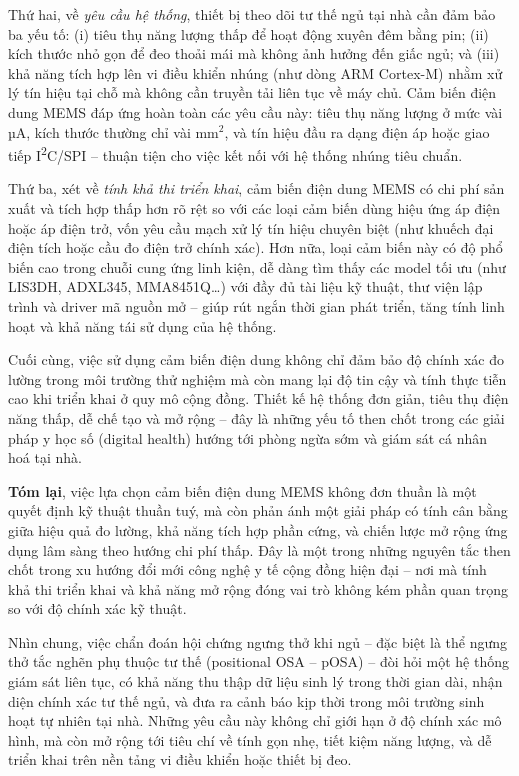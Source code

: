 Thứ hai, về \textit{yêu cầu hệ thống}, thiết bị theo dõi tư thế ngủ tại nhà cần
đảm bảo ba yếu tố: (i) tiêu thụ năng lượng thấp để hoạt động xuyên đêm bằng
pin; (ii) kích thước nhỏ gọn để đeo thoải mái mà không ảnh hưởng đến giấc ngủ;
và (iii) khả năng tích hợp lên vi điều khiển nhúng (như dòng ARM Cortex-M) nhằm
xử lý tín hiệu tại chỗ mà không cần truyền tải liên tục về máy chủ. Cảm biến
điện dung MEMS đáp ứng hoàn toàn các yêu cầu này: tiêu thụ năng lượng ở mức vài
µA, kích thước thường chỉ vài mm$^2$, và tín hiệu đầu ra dạng điện áp hoặc giao
tiếp I\textsuperscript{2}C/SPI – thuận tiện cho việc kết nối với hệ thống nhúng
tiêu chuẩn.

Thứ ba, xét về \textit{tính khả thi triển khai}, cảm biến điện dung MEMS có chi
phí sản xuất và tích hợp thấp hơn rõ rệt so với các loại cảm biến dùng hiệu ứng
áp điện hoặc áp điện trở, vốn yêu cầu mạch xử lý tín hiệu chuyên biệt (như
khuếch đại điện tích hoặc cầu đo điện trở chính xác). Hơn nữa, loại cảm biến
này có độ phổ biến cao trong chuỗi cung ứng linh kiện, dễ dàng tìm thấy các
model tối ưu (như LIS3DH, ADXL345, MMA8451Q\ldots) với đầy đủ tài liệu kỹ
thuật, thư viện lập trình và driver mã nguồn mở – giúp rút ngắn thời gian phát
triển, tăng tính linh hoạt và khả năng tái sử dụng của hệ thống.

Cuối cùng, việc sử dụng cảm biến điện dung không chỉ đảm bảo độ chính xác đo
lường trong môi trường thử nghiệm mà còn mang lại độ tin cậy và tính thực tiễn
cao khi triển khai ở quy mô cộng đồng. Thiết kế hệ thống đơn giản, tiêu thụ
điện năng thấp, dễ chế tạo và mở rộng – đây là những yếu tố then chốt trong các
giải pháp y học số (digital health) hướng tới phòng ngừa sớm và giám sát cá
nhân hoá tại nhà.

\textbf{Tóm lại}, việc lựa chọn cảm biến điện dung MEMS không đơn thuần là một quyết định kỹ thuật thuần tuý, mà còn phản ánh một giải pháp có tính cân bằng giữa hiệu quả đo lường, khả năng tích hợp phần cứng, và chiến lược mở rộng ứng dụng lâm sàng theo hướng chi phí thấp. Đây là một trong những nguyên tắc then chốt trong xu hướng đổi mới công nghệ y tế cộng đồng hiện đại – nơi mà tính khả thi triển khai và khả năng mở rộng đóng vai trò không kém phần quan trọng so với độ chính xác kỹ thuật.

\vspace{1em}

Nhìn chung, việc chẩn đoán hội chứng ngưng thở khi ngủ – đặc biệt là thể ngưng
thở tắc nghẽn phụ thuộc tư thế (positional OSA – pOSA) – đòi hỏi một hệ thống
giám sát liên tục, có khả năng thu thập dữ liệu sinh lý trong thời gian dài,
nhận diện chính xác tư thế ngủ, và đưa ra cảnh báo kịp thời trong môi trường
sinh hoạt tự nhiên tại nhà. Những yêu cầu này không chỉ giới hạn ở độ chính xác
mô hình, mà còn mở rộng tới tiêu chí về tính gọn nhẹ, tiết kiệm năng lượng, và
dễ triển khai trên nền tảng vi điều khiển hoặc thiết bị đeo.

